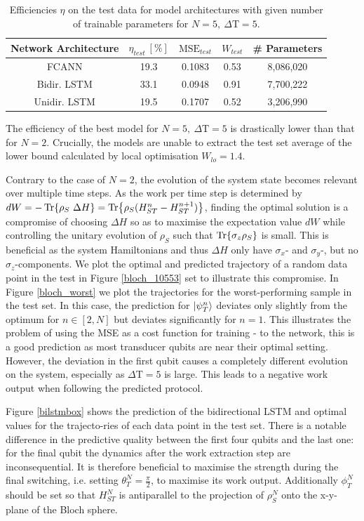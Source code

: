 \begin{table}[h]
	\centering
	\begin{tabular}{ c | c | c | c | c}
		Network Architecture & $\eta_{test} \ [\%]$ & $\mathrm{MSE}_{test}$ & $W_{test}$ & \# Parameters \\
		\hline
		FCANN        & 19.3 & 0.1083 & 0.53 & 8,086,020 \\
		Bidir. LSTM  & 33.1 & 0.0948 & 0.91 & 7,700,222 \\
		Unidir. LSTM & 19.5 & 0.1707 & 0.52 & 3,206,990\\
	\end{tabular}
	\caption{Efficiencies $\eta$ on the test data for model architectures with given number of trainable parameters for $N=5, \ \Delta \mathrm{T} = 5$.}
	\label{n5efftable}
\end{table}

The efficiency of the best model for $N=5, \ \Delta \mathrm{T} = 5$ is drastically lower than that for $N=2$.
Crucially, the models are unable to extract the test set average of the lower bound calculated by local optimisation $W_{lo} = 1.4$.

Contrary to the case of $N=2$, the evolution of the system state becomes relevant over multiple time steps.
As the work per time step is determined by $dW = -\Tr{\rho_S \ \Delta H} = \Tr{\rho_S (H_{ST}^n - H_{ST}^{n+1})}$, finding the optimal solution is a compromise of choosing $\Delta H$ so as to maximise the expectation value $dW$ while controlling the unitary evolution of $\rho_S$ such that $\Tr{\sigma_z \rho_S}$ is small.
This is beneficial as the system Hamiltonians and thus $\Delta H$ only have $\sigma_x$- and $\sigma_y$-, but no $\sigma_z$-components.
We plot the optimal and predicted trajectory of a random data point in the test in Figure \ref{bloch_10553} set to illustrate this compromise.
In Figure \ref{bloch_worst} we plot the trajectories for the worst-performing sample in the test set.
In this case, the prediction for $\ket{\psi_T^n}$ deviates only slightly from the optimum for $n \in [2, N]$ but deviates significantly for $n=1$.
This illustrates the problem of using the MSE as a cost function for training - to the network, this is a good prediction as most transducer qubits are near their optimal setting.
However, the deviation in the first qubit causes a completely different evolution on the system, especially as $\Delta \mathrm{T} = 5$ is large.
This leads to a negative work output when following the predicted protocol.

Figure \ref{bilstmbox} shows the prediction of the bidirectional LSTM and optimal values for the trajecto-ries of each data point in the test set.
There is a notable difference in the predictive quality between the first four qubits and the last one: for the final qubit the dynamics after the work extraction step are inconsequential.
It is therefore beneficial to maximise the strength during the final switching, i.e. setting $\theta_T^N = \frac{\pi}{2}$, to maximise its work output.
Additionally $\phi_T^N$ should be set so that $H_{ST}^N$ is antiparallel to the projection of $\rho_S^N$ onto the x-y-plane of the Bloch sphere.

